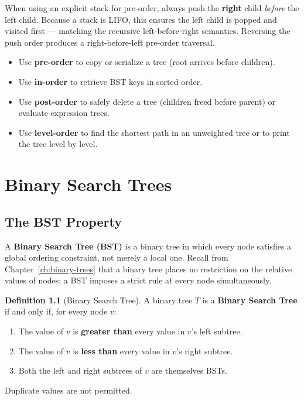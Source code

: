 \documentclass[11pt, a4paper, notitlepage]{report}
\theoremstyle{definition}
\newtheorem{definition}[theorem]{Definition}
\theoremstyle{remark}
\theoremstyle{definition}
\begin{document}
\begin{warning}[title={Warning: Push Order Matters}]
When using an explicit stack for pre-order, always push the \textbf{right}
child \emph{before} the left child.  Because a stack is LIFO, this ensures
the left child is popped and visited first --- matching the recursive
left-before-right semantics.  Reversing the push order produces a
right-before-left pre-order traversal.
\end{warning}

\begin{examtip}[title={Exam Tip: Choosing a Traversal}]
\begin{itemize}
  \item Use \textbf{pre-order} to copy or serialize a tree (root arrives before children).
  \item Use \textbf{in-order} to retrieve BST keys in sorted order.
  \item Use \textbf{post-order} to safely delete a tree (children freed before parent) or evaluate expression trees.
  \item Use \textbf{level-order} to find the shortest path in an unweighted tree or to print the tree level by level.
\end{itemize}
\end{examtip}

\chapter{Binary Search Trees}
\label{ch:bst}

\section{The BST Property}
\label{sec:bst-property}

A \textbf{Binary Search Tree (BST)} is a binary tree in which every node satisfies a global
ordering constraint, not merely a local one.  Recall from Chapter~\ref{ch:binary-trees} that a
binary tree places no restriction on the relative values of nodes; a BST imposes a strict rule
at every node simultaneously.

\begin{definition}[Binary Search Tree]
\label{def:bst}
A binary tree $T$ is a \textbf{Binary Search Tree} if and only if, for every node $v$:
\begin{enumerate}
  \item The value of $v$ is \textbf{greater than} every value in $v$'s left subtree.
  \item The value of $v$ is \textbf{less than} every value in $v$'s right subtree.
  \item Both the left and right subtrees of $v$ are themselves BSTs.
\end{enumerate}
Duplicate values are not permitted.
\end{definition}
\end{document}
